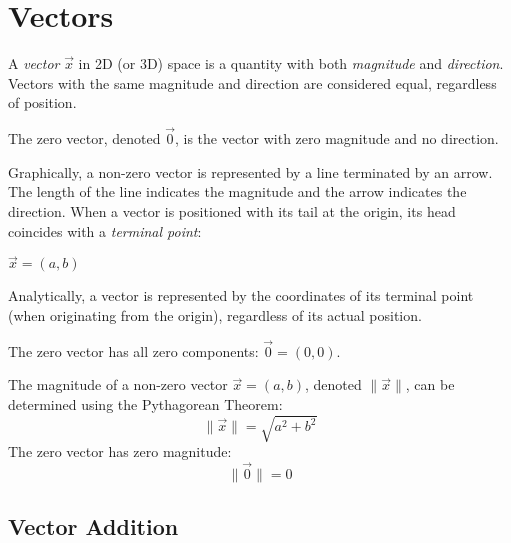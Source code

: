 \documentclass[letterpaper,12pt,fleqn]{article}
\newcommand{\vx}{\vec{x}}
\newcommand{\vz}{\vec{0}}
\newcommand{\norm}[1]{\|#1\|}
\begin{document}
\section*{Vectors}

\begin{definition}
  A \emph{vector} $\vx$ in 2D (or 3D) space is a quantity with both
  \emph{magnitude} and \emph{direction}. Vectors with the same magnitude and
  direction are considered equal, regardless of position.

  The zero vector, denoted $\vz$, is the vector with zero magnitude and no
  direction.
\end{definition}

Graphically, a non-zero vector is represented by a line terminated by an
arrow. The length of the line indicates the magnitude and the arrow indicates
the direction. When a vector is positioned with its tail at the origin, its
head coincides with a \emph{terminal point}:

\begin{center}
  
  $\vx=(a,b)$
\end{center}

Analytically, a vector is represented by the coordinates of its terminal point
(when originating from the origin), regardless of its actual position.

The zero vector has all zero components: $\vz=(0,0)$.

\begin{notation}
  The magnitude of a non-zero vector $\vx=(a,b)$, denoted $\norm{\vx}$, can be
  determined using the Pythagorean Theorem:
  \[\norm{\vx}=\sqrt{a^2+b^2}\]
  The zero vector has zero magnitude:
  \[\norm{\vz}=0\]
\end{notation}

\newpage

\subsection*{Vector Addition}
\end{document}

